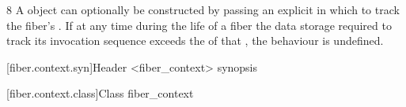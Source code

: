 8 A \fiber object can optionally be constructed by passing an explicit
 in which to track the fiber's
. If at any time during the
life of a fiber the data storage required to track its invocation sequence
exceeds the  of that , the behaviour is undefined.



[fiber.context.syn]{Header <fiber\_context> synopsis}


[fiber.context.class]{Class fiber\_context}

